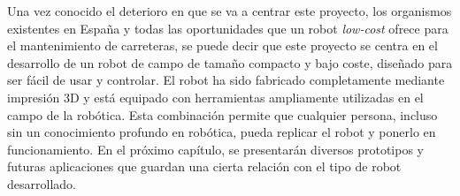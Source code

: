 Una vez conocido el deterioro en que se va a centrar este proyecto, los organismos existentes en España y todas las oportunidades que un robot \textit{low-cost} ofrece para el mantenimiento de carreteras, se puede decir que este proyecto se centra en el desarrollo de un robot de campo de tamaño compacto y bajo coste, diseñado para ser fácil de usar y controlar. El robot ha sido fabricado completamente mediante impresión 3D y está equipado con herramientas ampliamente utilizadas en el campo de la robótica. Esta combinación permite que cualquier persona, incluso sin un conocimiento profundo en robótica, pueda replicar el robot y ponerlo en funcionamiento. En el próximo capítulo, se presentarán diversos prototipos y futuras aplicaciones que guardan una cierta relación con el tipo de robot desarrollado.\\




